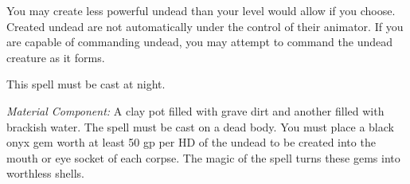 You may create less powerful undead than your level would allow if you choose. 
Created undead are not automatically under the control of their animator. If you 
are capable of commanding undead, you may attempt to command the undead creature 
as it forms.

This spell must be cast at night.

\textit{Material Component:} A clay pot filled with grave dirt and another filled 
with brackish water. The spell must be cast on a dead body. You must place a black 
onyx gem worth at least 50 gp per HD of the undead to be created into the mouth 
or eye socket of each corpse. The magic of the spell turns these gems into worthless 
shells.

